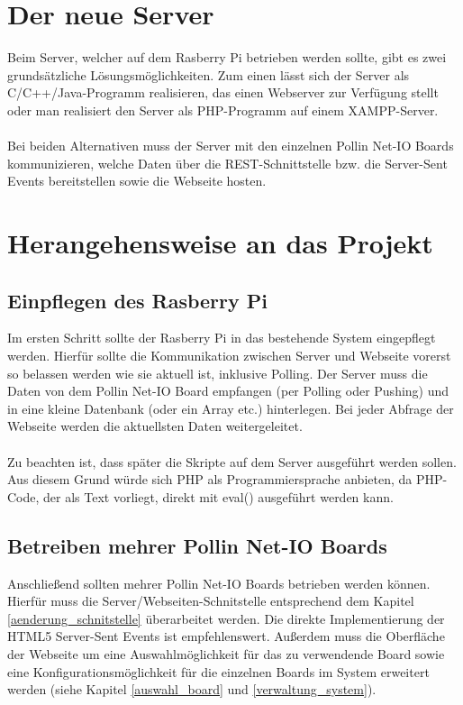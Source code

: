 \section{Der neue Server}
Beim Server, welcher auf dem Rasberry Pi betrieben werden sollte, gibt es zwei
grundsätzliche Lösungsmöglichkeiten. Zum einen lässt sich der Server als
C/C++/Java-Programm realisieren, das einen Webserver zur Verfügung stellt oder
man realisiert den Server als PHP-Programm auf einem XAMPP-Server.\\
\\
Bei beiden Alternativen muss der Server mit den einzelnen Pollin Net-IO Boards
kommunizieren, welche Daten über die REST-Schnittstelle bzw. die Server-Sent Events
bereitstellen sowie die Webseite hosten.

\section{Herangehensweise an das Projekt}
\subsection{Einpflegen des Rasberry Pi}
Im ersten Schritt sollte der Rasberry Pi in das bestehende System eingepflegt
werden. Hierfür sollte die Kommunikation zwischen Server und Webseite vorerst so
belassen werden wie sie aktuell ist, inklusive Polling. Der Server muss die
Daten von dem Pollin Net-IO Board empfangen (per Polling oder Pushing) und in
eine kleine Datenbank (oder ein Array etc.) hinterlegen. Bei jeder Abfrage der
Webseite werden die aktuellsten Daten weitergeleitet.\\
\\
Zu beachten ist, dass später die Skripte auf dem Server ausgeführt werden sollen.
Aus diesem Grund würde sich PHP als Programmiersprache anbieten, da PHP-Code,
der als Text vorliegt, direkt mit \textrm{eval()} ausgeführt werden kann.

\subsection{Betreiben mehrer Pollin Net-IO Boards}
Anschließend sollten mehrer Pollin Net-IO Boards betrieben werden können.
Hierfür muss die Server/Webseiten-Schnitstelle entsprechend dem Kapitel
\ref{aenderung_schnitstelle} überarbeitet werden. Die direkte Implementierung
der HTML5 Server-Sent Events ist empfehlenswert. Außerdem muss die Oberfläche
der Webseite um eine Auswahlmöglichkeit für das zu verwendende Board sowie eine
Konfigurationsmöglichkeit für die einzelnen Boards im System erweitert werden
(siehe Kapitel \ref{auswahl_board} und \ref{verwaltung_system}).

